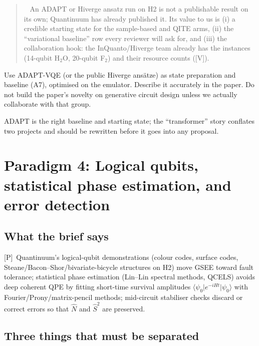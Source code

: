 \documentclass[11pt,a4paper]{article}
\newcommand{\ket}[1]{\lvert #1\rangle}
\newcommand{\bra}[1]{\langle #1\rvert}
\newcommand{\lP}{\textcolor{keyblue}{[P]}}   %
\newcommand{\lV}{\textcolor{keyblue}{[V]}}   %
\newenvironment{caution}[1][Caution]{\par\smallskip\begin{quotation}\noindent{\bfseries\textcolor{alertred}{#1.}}\ }{\end{quotation}\smallskip}
\newcommand{\takeaway}[1]{\par\smallskip\noindent{\bfseries\textcolor{keyblue}{Takeaway.}} #1\par\smallskip}
\newcommand{\verdict}[1]{\par\smallskip\noindent{\bfseries\textcolor{keyblue}{Verdict for our paper.}} #1\par\smallskip}
\begin{document}
\begin{caution}[Novelty]
An ADAPT or Hiverge ansatz run on H2 is not a publishable result on its own; Quantinuum has already published it. Its value to us is (i) a credible starting state for the sample-based and QITE arms, (ii) the ``variational baseline'' row every reviewer will ask for, and (iii) the collaboration hook: the InQuanto/Hiverge team already has the instances (14-qubit H$_2$O, 20-qubit F$_2$) and their resource counts (\lV).
\end{caution}

\verdict{Use ADAPT-VQE (or the public Hiverge ans\"atze) as state preparation and baseline (A7), optimised on the emulator. Describe it accurately in the paper. Do not build the paper's novelty on generative circuit design unless we actually collaborate with that group.}

\takeaway{ADAPT is the right baseline and starting state; the ``transformer'' story conflates two projects and should be rewritten before it goes into any proposal.}

\section{Paradigm 4: Logical qubits, statistical phase estimation, and error detection}\label{sec:p4}

\subsection{What the brief says}
\lP\ Quantinuum's logical-qubit demonstrations (colour codes, surface codes, Steane/Bacon--Shor/bivariate-bicycle structures on H2) move GSEE toward fault tolerance; statistical phase estimation (Lin--Lin spectral methods, QCELS) avoids deep coherent QPE by fitting short-time survival amplitudes $\bra{\psi_0}e^{-iHt}\ket{\psi_0}$ with Fourier/Prony/matrix-pencil methods; mid-circuit stabiliser checks discard or correct errors so that $\hat N$ and $\hat S^2$ are preserved.

\subsection{Three things that must be separated}
\end{document}
